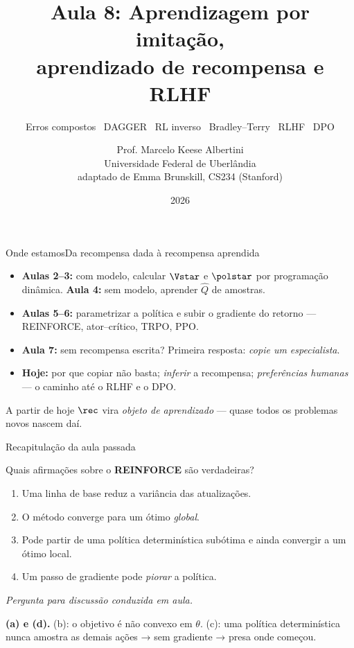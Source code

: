 \documentclass[aspectratio=169, 11pt]{beamer}
\title[Aula 8 — Imitação, recompensa e RLHF]{Aula 8: Aprendizagem por imitação,\\ aprendizado de recompensa e RLHF}
\subtitle[Aprendizagem por Reforço]{Erros compostos \textbullet\ DAGGER \textbullet\ RL inverso \textbullet\ Bradley--Terry \textbullet\ RLHF \textbullet\ DPO}
\author[Prof. Marcelo K. Albertini]{Prof. Marcelo Keese Albertini \\
  \footnotesize Universidade Federal de Uberlândia \\
  \footnotesize adaptado de Emma Brunskill, CS234 (Stanford)}
\institute{Universidade Federal de Uberlândia}
\date{2026}
\newcommand{\paradiscussao}{\smallskip
  {\footnotesize\color{rlCinza}\itshape Pergunta para discussão conduzida em aula.}}
\newcommand{\thv}{\theta}
\newcommand{\Qhat}{\hat{Q}}
\begin{document}
\begin{frame}\titlepage\end{frame}

\begin{frame}{Onde estamos}{Da recompensa dada à recompensa aprendida}

  \begin{itemize}\setlength{\itemsep}{0.45ex}
    \item \textbf{Aulas 2--3:} com modelo, calcular $\Vstar$ e $\polstar$ por
      programação dinâmica. \textbf{Aula 4:} sem modelo, aprender $\Qhat$ de
      amostras.
    \item \textbf{Aulas 5--6:} parametrizar a política e subir o gradiente do
      retorno --- REINFORCE, ator--crítico, TRPO, PPO.
    \item \textbf{Aula 7:} sem recompensa escrita? Primeira resposta:
      \emph{copie um especialista}.
    \item \textbf{Hoje:} por que copiar não basta; \emph{inferir} a recompensa;
      \emph{preferências humanas} --- o caminho até o RLHF e o DPO.
  \end{itemize}

  \begin{ideiabox}
    A partir de hoje $\rec$ vira \emph{objeto de aprendizado} --- quase todos
    os problemas novos nascem daí.
  \end{ideiabox}
\end{frame}

\begin{frame}[shrink]{Recapitulação da aula passada}

  \begin{quizbox}{}
    Quais afirmações sobre o \textbf{REINFORCE} são verdadeiras?
    \begin{enumerate}\setlength{\itemsep}{0ex}
      \item[(a)] Uma linha de base reduz a variância das atualizações.
      \item[(b)] O método converge para um ótimo \emph{global}.
      \item[(c)] Pode partir de uma política determinística subótima e ainda
        convergir a um ótimo local.
      \item[(d)] Um passo de gradiente pode \emph{piorar} a política.
    \end{enumerate}
    \vspace{-0.3em}\paradiscussao
  \end{quizbox}

  \pause

  \begin{respbox}
    \textbf{(a) e (d).} \;(b): o objetivo é não convexo em $\thv$. \;(c): uma
    política determinística nunca amostra as demais ações → sem gradiente →
    presa onde começou.
  \end{respbox}
\end{frame}
\end{document}
